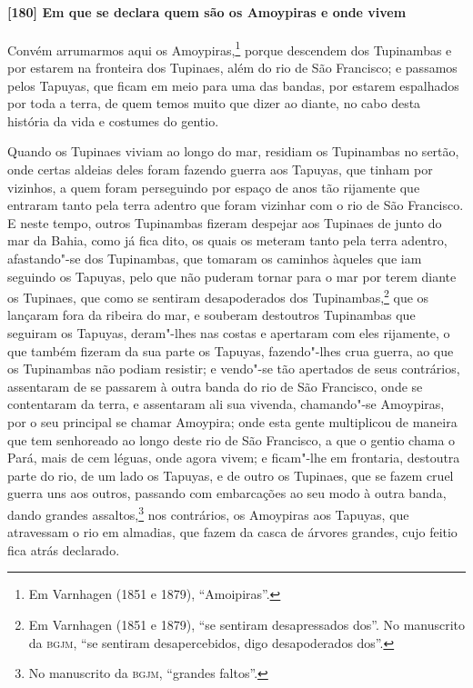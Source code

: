 \begin{linenumbers}
\paragraph{[180] Em que se declara quem são os Amoypiras e onde vivem}\quad
Convém arrumarmos aqui os Amoypiras,\footnote{ Em Varnhagen (1851 e 1879), ``Amoipiras''.}
porque descendem dos Tupinambas e por estarem na fronteira dos Tupinaes, além do rio de
São Francisco; e passamos pelos Tapuyas, que ficam em meio para uma das bandas, por
estarem espalhados por toda a terra, de quem temos muito que dizer ao diante, no cabo
desta história da vida e costumes do gentio.

Quando os Tupinaes viviam ao longo do mar, residiam os Tupinambas no sertão, onde certas
aldeias deles foram fazendo guerra aos Tapuyas, que tinham por vizinhos, a quem foram
perseguindo por espaço de anos tão rijamente que entraram tanto pela terra adentro que
foram vizinhar com o rio de São Francisco. E neste tempo, outros Tupinambas fizeram
despejar aos Tupinaes de junto do mar da Bahia, como já fica dito, os quais os meteram
tanto pela terra adentro, afastando"-se dos Tupinambas, que tomaram os caminhos àqueles que
iam seguindo os Tapuyas, pelo que não puderam tornar para o mar por terem diante os
Tupinaes, que como se sentiram desapoderados dos Tupinambas,\footnote{ Em Varnhagen (1851
e 1879), ``se sentiram desapressados dos''. No manuscrito da \textsc{bgjm}, ``se sentiram
desapercebidos, digo desapoderados dos''.} que os lançaram fora da ribeira do mar, e
souberam destoutros Tupinambas que seguiram os Tapuyas, deram"-lhes nas costas e apertaram
com eles rijamente, o que também fizeram da sua parte os Tapuyas, fazendo"-lhes crua
guerra, ao que os Tupinambas não podiam resistir; e vendo"-se tão apertados de seus
contrários, assentaram de se passarem à outra banda do rio de São Francisco, onde se
contentaram da terra, e assentaram ali sua vivenda, chamando"-se Amoypiras, por o seu
principal se chamar Amoypira; onde esta gente multiplicou de maneira que tem senhoreado ao
longo deste rio de São Francisco, a que o gentio chama o Pará, mais de cem léguas, onde
agora vivem; e ficam"-lhe em frontaria, destoutra parte do rio, de um lado os Tapuyas, e de
outro os Tupinaes, que se fazem cruel guerra uns aos outros, passando com embarcações ao
seu modo à outra banda, dando grandes assaltos,\footnote{ No manuscrito da \textsc{bgjm},
``grandes faltos''.} nos contrários, os Amoypiras aos Tapuyas, que atravessam o rio em
almadias, que fazem da casca de árvores grandes, cujo feitio fica atrás declarado.


\end{linenumbers}
